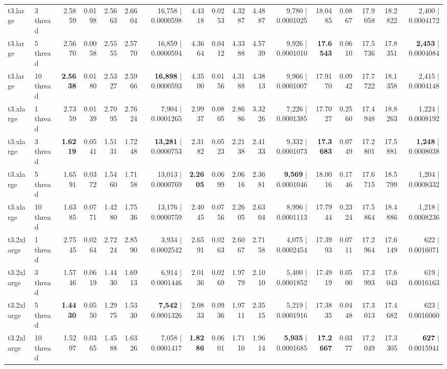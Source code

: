 \documentclass[conference]{IEEEtran}
\begin{document}
\begin{table}[htbp]
{\begin{tabular}{ll|rrrrr|rrrrr|rrrrr}
				t3.large & 3 thread & 2.5859 & 0.0198 & 2.5663 & 2.6604 & 16,758 | 0.0000598 & 4.4318 & 0.0253 & 4.3287 & 4.4887 & 9,780 | 0.0001025 & 18.0485 & 0.0867 & 17.9058 & 18.2822 & 2,400 | 0.0004172 \\
				t3.large & 5 thread & 2.5670 & 0.0058 & 2.5555 & 2.5770 & 16,859 | 0.0000594 & 4.3664 & 0.0412 & 4.3388 & 4.5739 & 9,926 | 0.0001010 & \textbf{17.6543} & 0.0610 & 17.5736 & 17.8351 & \textbf{2,453} | 0.0004084 \\
				t3.large & 10 thread & \textbf{2.5638} & 0.0180 & 2.5327 & 2.5966 & \textbf{16,898} | 0.0000593 & 4.3500 & 0.0156 & 4.3188 & 4.3813 & 9,966 | 0.0001007 & 17.9170 & 0.0942 & 17.7722 & 18.1358 & 2,415 | 0.0004148 \\
				\midrule
				t3.xlarge & 1 thread & 2.7359 & 0.0139 & 2.7095 & 2.7624 & 7,904 | 0.0001265 & 2.9937 & 0.0805 & 2.8686 & 3.3226 & 7,226 | 0.0001385 & 17.7027 & 0.2560 & 17.4948 & 18.8263 & 1,224 | 0.0008192 \\
				t3.xlarge & 3 thread & \textbf{1.6219} & 0.0541 & 1.5131 & 1.7248 & \textbf{13,281} | 0.0000753 & 2.3182 & 0.0523 & 2.2138 & 2.4133 & 9,332 | 0.0001073 & \textbf{17.3683} & 0.0749 & 17.2801 & 17.5881 & \textbf{1,248} | 0.0008038 \\
				t3.xlarge & 5 thread & 1.6591 & 0.0372 & 1.5460 & 1.7158 & 13,013 | 0.0000769 & \textbf{2.2605} & 0.0699 & 2.0616 & 2.3681 & \textbf{9,569} | 0.0001046 & 18.0016 & 0.1746 & 17.6715 & 18.5799 & 1,204 | 0.0008332 \\
				t3.xlarge & 10 thread & 1.6385 & 0.0771 & 1.4280 & 1.7536 & 13,176 | 0.0000759 & 2.4045 & 0.0756 & 2.2605 & 2.6304 & 8,996 | 0.0001113 & 17.7944 & 0.2324 & 17.5864 & 18.4886 & 1,218 | 0.0008236 \\
				\midrule
				t3.2xlarge & 1 thread & 2.7545 & 0.0264 & 2.7224 & 2.8590 & 3,934 | 0.0002542 & 2.6591 & 0.0263 & 2.6067 & 2.7158 & 4,075 | 0.0002454 & 17.3993 & 0.0711 & 17.2964 & 17.6149 & 622 | 0.0016071 \\
				t3.2xlarge & 3 thread & 1.5746 & 0.0619 & 1.4430 & 1.6913 & 6,914 | 0.0001446 & 2.0136 & 0.0269 & 1.9779 & 2.1010 & 5,400 | 0.0001852 & 17.4919 & 0.0500 & 17.3993 & 17.6043 & 619 | 0.0016163 \\
				t3.2xlarge & 5 thread & \textbf{1.4430} & 0.0550 & 1.2975 & 1.5330 & \textbf{7,542} | 0.0001326 & 2.0833 & 0.0936 & 1.9711 & 2.3515 & 5,219 | 0.0001916 & 17.3835 & 0.0448 & 17.3013 & 17.4682 & 623 | 0.0016060 \\
				t3.2xlarge & 10 thread & 1.5297 & 0.0365 & 1.4588 & 1.6326 & 7,058 | 0.0001417 & \textbf{1.8286} & 0.0601 & 1.7110 & 1.9614 & \textbf{5,935} | 0.0001685 & \textbf{17.2667} & 0.0377 & 17.2049 & 17.3305 & \textbf{627} | 0.0015941 \\
				\bottomrule
			\end{tabular}
		}
	\end{table}
	
\end{document}
